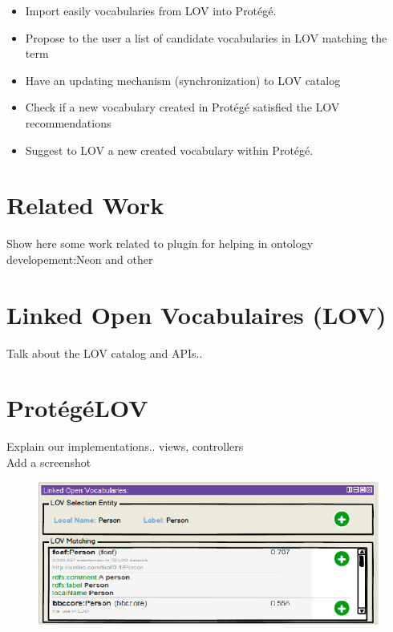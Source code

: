 \documentclass[runningheads,a4paper]{llncs}
\begin{document}
\begin{itemize}
\item Import easily vocabularies from LOV into Prot{\'e}g{\'e}. 
\item Propose to the user a list of candidate vocabularies in LOV matching the term
\item Have an updating mechanism (synchronization) to LOV catalog
\item Check if a new vocabulary created in Prot{\'e}g{\'e} satisfied the LOV recommendations

\item Suggest to LOV a new created vocabulary within Prot{\'e}g{\'e}.
\end{itemize}






\section{Related Work}
\label{sec:soa}

Show here some work related to plugin for helping in ontology developement:Neon and other


\section{Linked Open Vocabulaires (LOV)}
\label{sec:lov}

Talk about the LOV catalog and APIs..



\section{Prot{\'e}g{\'e}LOV}
\label{sec:classification}
Explain our implementations.. views, controllers\\
Add a screenshot

\begin{figure}
\center
\includegraphics[scale=0.7]{LOVmockup.png}
\end{figure}
\end{document}
